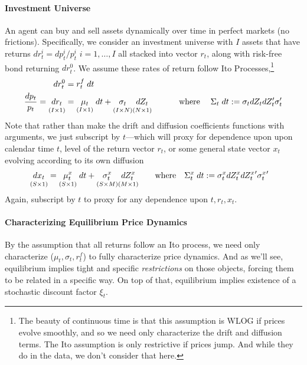 \documentclass[12pt]{article}
\theoremstyle{plain}
\theoremstyle{definition}
\theoremstyle{remark}
\begin{document}
\paragraph{Investment Universe}
An agent can buy and sell assets dynamically over time in perfect
markets (no frictions).
Specifically, we consider an investment universe with $I$ assets that
have returns $dr_t^i=dp_t^i/p_t^i$ $i=1,\ldots,I$
all stacked into vector $r_t$, along with risk-free bond returning
$dr_t^0$.
We assume these rates of return follow Ito Processes,\footnote{%
  The beauty of continuous time is that this assumption is WLOG if
  prices evolve smoothly, and so we need only characterize the drift and
  diffusion terms. The Ito assumption is only restrictive if prices
  jump. And while they do in the data, we don't consider that here.
}
\begin{align*}
  dr_t^0 &= r^f_t \;dt \\
  \frac{dp_t}{p_t}
  =
  \underset{(I\times 1)}{dr_t\vphantom{\mu(x_t)}}
  &=
  \underset{(I\times 1)}{\mu_t}
  \;dt
  +
  \underset{(I\times N)}{\sigma_t\vphantom{\mu(x_t)}}
  \underset{(N\times 1)}{dZ_t\vphantom{\mu(x_t)}}
  \;\quad\qquad\text{where}\quad
  \;\Sigma_t\;dt
  :=
  \sigma_t
  dZ_t
  dZ_t'
  \sigma_t'
\end{align*}
Note that rather than make the drift and diffusion coefficients
functions with arguments, we just subscript by $t$---which will proxy
for dependence upon upon calendar time $t$, level of the return vector
$r_t$, or some general state vector $x_t$ evolving according to its own
diffusion
\begin{align}
  \underset{(S\times 1)}{dx_t\vphantom{\mu(x_t)}}
  &=
  \underset{(S\times 1)}{\mu^x_t}
  \;dt
  +
  \underset{(S\times M)}{\sigma^x_t}
  \underset{(M\times 1)}{dZ_t^x\vphantom{\mu(x_t)}}
  \qquad\text{where}\quad
  \Sigma^x_t\;dt
  :=
  \sigma^x_t
  dZ_t^x
  {dZ_t^x}'
  {\sigma^x_t}'
  \label{dx}
\end{align}
Again, subscript by $t$ to proxy for any dependence upon $t,r_t,x_t$.


\paragraph{Characterizing Equilibrium Price Dynamics}
By the assumption that all returns follow an Ito process, we need only
characterize ($\mu_t, \sigma_t, r_t^f$) to fully characterize price
dynamics.
And as we'll see, equilibrium implies tight and specific
\emph{restrictions} on those objects, forcing them to be related in a
specific way. On top of that, equilibrium implies existence of a
stochastic discount factor $\xi_t$.
\end{document}
